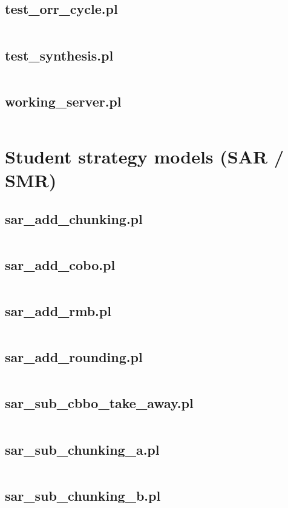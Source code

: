 \documentclass{article}
\begin{document}
\subsection{test\_orr\_cycle.pl}
\inputminted{prolog}{test_orr_cycle.pl}
\subsection{test\_synthesis.pl}
\inputminted{prolog}{test_synthesis.pl}
\subsection{working\_server.pl}
\inputminted{prolog}{working_server.pl}

\section{Student strategy models (SAR / SMR)}
\subsection{sar\_add\_chunking.pl}
\inputminted{prolog}{sar_add_chunking.pl}
\subsection{sar\_add\_cobo.pl}
\inputminted{prolog}{sar_add_cobo.pl}
\subsection{sar\_add\_rmb.pl}
\inputminted{prolog}{sar_add_rmb.pl}
\subsection{sar\_add\_rounding.pl}
\inputminted{prolog}{sar_add_rounding.pl}
\subsection{sar\_sub\_cbbo\_take\_away.pl}
\inputminted{prolog}{sar_sub_cbbo_take_away.pl}
\subsection{sar\_sub\_chunking\_a.pl}
\inputminted{prolog}{sar_sub_chunking_a.pl}
\subsection{sar\_sub\_chunking\_b.pl}
\inputminted{prolog}{sar_sub_chunking_b.pl}
\end{document}
